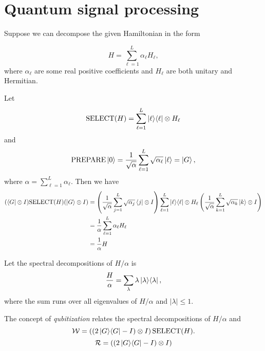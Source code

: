 \documentclass[11pt, oneside]{article}   	%
\begin{document}
\section{Quantum signal processing}
Suppose we can decompose the given Hamiltonian in the form

\begin{equation*} 
H = \sum^L_{\ell = 1} \alpha_{\ell} H_{\ell},
\end{equation*}
where $\alpha_{\ell}$ are some real positive coefficients and $H_{\ell}$ are both unitary and Hermitian.

Let 
\begin{equation*} 
\textrm{SELECT}(H) = \sum^{L}_{\ell = 1} \ket{\ell} \! \bra{\ell} \otimes H_{\ell}
\end{equation*}
and 
\begin{equation*} 
\textrm{PREPARE} \ket{0} = \frac{1}{\sqrt{\alpha}} \sum^{L}_{\ell = 1} \sqrt{\alpha_{\ell}} \ket{\ell} = \ket{G},
\end{equation*}
where $\alpha = \sum^L_{\ell = 1} \alpha_{\ell}$.
Then we have
\begin{align*} 
(\bra{G} \otimes I) \textrm{SELECT}(H) (\ket{G} \otimes I) 
&= \left( \frac{1}{\sqrt{\alpha}} \sum^{L}_{j = 1} \sqrt{\alpha_{j}} \bra{j} \otimes I \right) \sum^{L}_{\ell = 1} \ket{\ell} \! \bra{\ell} \otimes H_{\ell} \left( \frac{1}{\sqrt{\alpha}} \sum^{L}_{k = 1} \sqrt{\alpha_{k}} \ket{k} \otimes I \right) \\
&=  \frac{1}{\alpha} \sum^{L}_{\ell = 1} \alpha_{\ell} H_{\ell} \\
&=  \frac{1}{\alpha} H
\end{align*}

Let the spectral decompositions of $H/\alpha$ is
\begin{equation*} 
\frac{H}{\alpha} = \sum_{\lambda} \lambda \ket{\lambda} \! \bra{\lambda},
\end{equation*}
where the sum runs over all eigenvalues of $H/\alpha$ and $|\lambda| \leq 1$.

The concept of \textit{qubitization} relates the spectral decompositions of $H/\alpha$ and 
\begin{equation*} 
\mathcal{W} = \left( (2 \ket{G} \! \bra{G} - I) \otimes I \right) \textrm{SELECT}(H).
\end{equation*}
\begin{equation*} 
\mathcal{R} = \left( (2 \ket{G} \! \bra{G} - I) \otimes I \right)
\end{equation*}
\end{document}
